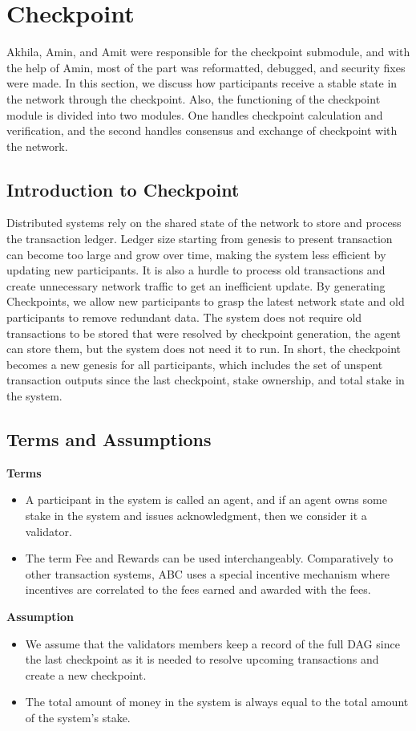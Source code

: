 \section{Checkpoint}
Akhila, Amin, and Amit were responsible for the checkpoint submodule, and with the help of Amin, most of the part was reformatted, debugged, and security fixes were made. In this section, we discuss how participants receive a stable state in the network through the checkpoint. Also, the functioning of the checkpoint module is divided into two modules. One handles checkpoint calculation and verification, and the second handles consensus and exchange of checkpoint with the network.
\subsection{Introduction to Checkpoint}

Distributed systems rely on the shared state of the network to store and process the transaction ledger. Ledger size starting from genesis to present transaction can become too large and grow over time, making the system less efficient by updating new participants. It is also a hurdle to process old transactions and create unnecessary network traffic to get an inefficient update. By generating Checkpoints, we allow new participants to grasp the latest network state and old participants to remove redundant data. The system does not require old transactions to be stored that were resolved by checkpoint generation, the agent can store them, but the system does not need it to run. In short, the checkpoint becomes a new genesis for all participants, which includes the set of unspent transaction outputs since the last checkpoint, stake ownership, and total stake in the system. 

\subsection{Terms and Assumptions}
\textbf{Terms}
\begin{itemize}
\item A participant in the system is called an agent, and if an agent owns some stake in the system and issues acknowledgment, then we consider it a validator.
\item The term Fee and Rewards can be used interchangeably. Comparatively to other transaction systems, ABC uses a special incentive mechanism where incentives are correlated to the fees earned and awarded with the fees.
\end{itemize}
\textbf{Assumption}
\begin{itemize}
\item We assume that the validators members keep a record of the full DAG since the last checkpoint as it is needed to resolve upcoming transactions and create a new checkpoint.
\item The total amount of money in the system is always equal to the total amount of the system's stake. 

\end{itemize}


